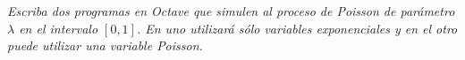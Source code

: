 \emph{
	Escriba dos programas en Octave que simulen al proceso de Poisson 
	de par\'ametro $\lambda$ en el intervalo $[0,1]$. En uno utilizar\'a 
	s\'olo variables exponenciales y en el otro puede utilizar una 
	variable Poisson.
}